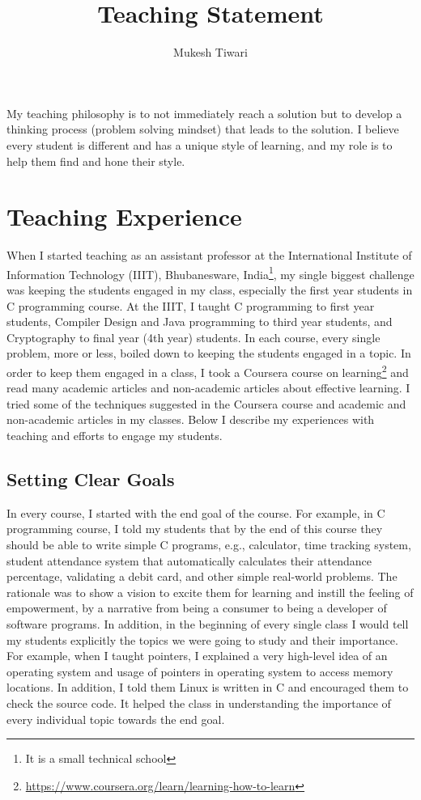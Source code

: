 \documentclass[a4paper]{article}
\title{Teaching Statement}
\author{Mukesh Tiwari}
\date{}
\begin{document}
\fontsize{12}{15}
\selectfont
\maketitle


My teaching philosophy is to not immediately reach a solution but to develop a 
thinking process (problem solving mindset) that leads to the solution. I believe every 
student is different and has a unique style of learning, and my role is to help them find 
and hone their style.

\section{Teaching Experience}
When I started teaching as an assistant professor at the International Institute of Information 
Technology (IIIT), Bhubanesware, India\footnote{It is a small technical school},
my single biggest challenge was keeping the students engaged in my class, especially the first year 
students in C programming course. At the IIIT, I taught C programming to 
first year students, Compiler Design and Java programming to third year students, and
Cryptography to final year (4th year) students. In each course, every single 
problem,  more or less, boiled down to keeping the students engaged in a topic. 
In order to keep them engaged in a class, I took a Coursera course on 
learning\footnote{\url{https://www.coursera.org/learn/learning-how-to-learn}} and 
read many academic articles and non-academic articles about effective learning.
I tried some of the techniques suggested in the Coursera course and 
academic and non-academic articles in my classes. Below I 
describe my experiences with teaching and efforts to engage my students. 





\subsection{Setting Clear Goals}
In every course, I started with the end goal of the course. For example, 
in C programming course, I told my students that by the end of this 
course they should be 
able to write simple C programs, e.g., calculator, time tracking system,
student attendance system that automatically calculates their attendance percentage, 
validating a debit card, and other simple real-world problems. The rationale was 
to show a vision to excite them 
for learning and instill the feeling of empowerment, by a narrative from
being a consumer to being a developer of software programs.
In addition, in the beginning of every single class 
I would tell my students explicitly the topics we were going to study and 
their importance. For example, when I taught pointers, I explained a 
very high-level idea of an operating system and usage of pointers  
in operating system to access memory locations.
In addition, I told them
Linux is written in C and encouraged them to check the source code.
It helped the class in understanding the importance of 
every individual topic towards the end goal.
\end{document}
